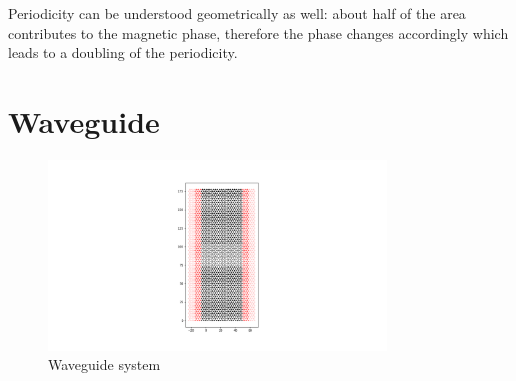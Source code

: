Periodicity can be understood geometrically as well: about half of the area contributes to the magnetic phase, therefore the phase changes accordingly which leads to a doubling of the periodicity.

\section{Waveguide}

\begin{figure}
\centering
\includegraphics[width=0.8\textwidth]{figure/numericalmodel/waveguide}
\caption{Waveguide system}\label{fig:waveguide-system}
\end{figure}


